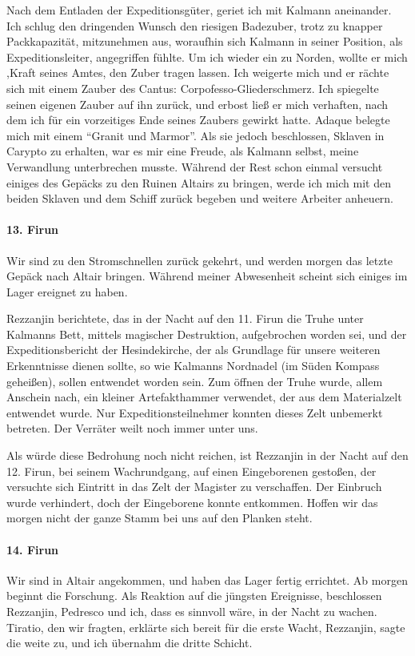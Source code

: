 Nach dem Entladen der Expeditionsgüter, geriet ich mit Kalmann aneinander. Ich schlug den dringenden Wunsch den riesigen Badezuber, trotz zu knapper Packkapazität, mitzunehmen aus, woraufhin sich Kalmann in seiner Position, als Expeditionsleiter, angegriffen fühlte. Um ich wieder ein zu Norden, wollte er mich ,Kraft seines Amtes, den Zuber tragen lassen. Ich weigerte mich und er rächte sich mit einem Zauber des Cantus: Corpofesso-Gliederschmerz. Ich spiegelte seinen eigenen Zauber auf ihn zurück, und erbost ließ er mich verhaften, nach dem ich für ein vorzeitiges Ende seines Zaubers gewirkt hatte. Adaque belegte mich mit einem ``Granit und Marmor''. Als sie jedoch beschlossen, Sklaven in Carypto zu erhalten, war es mir eine Freude, als Kalmann selbst, meine Verwandlung unterbrechen musste. Während der Rest schon einmal versucht einiges des Gepäcks zu den Ruinen Altairs zu bringen, werde ich mich mit den beiden Sklaven und dem Schiff zurück begeben und weitere Arbeiter anheuern.

\paragraph{13. Firun}
Wir sind zu den Stromschnellen zurück gekehrt, und werden morgen das letzte Gepäck nach Altair bringen. Während meiner Abwesenheit scheint sich einiges im Lager ereignet zu haben.

Rezzanjin berichtete, das in der Nacht auf den 11. Firun die Truhe unter Kalmanns Bett, mittels magischer Destruktion, aufgebrochen worden sei, und der Expeditionsbericht der Hesindekirche, der als Grundlage für unsere weiteren Erkenntnisse dienen sollte, so wie Kalmanns Nordnadel (im Süden Kompass geheißen), sollen entwendet worden sein. Zum öffnen der Truhe wurde, allem Anschein nach, ein kleiner Artefakthammer verwendet, der aus dem Materialzelt entwendet wurde. Nur Expeditionsteilnehmer konnten dieses Zelt unbemerkt betreten. Der Verräter weilt noch immer unter uns.

Als würde diese Bedrohung noch nicht reichen, ist Rezzanjin in der Nacht auf den 12. Firun, bei seinem Wachrundgang, auf einen Eingeborenen gestoßen, der versuchte sich Eintritt in das Zelt der Magister zu verschaffen. Der Einbruch wurde verhindert, doch der Eingeborene konnte entkommen. Hoffen wir das morgen nicht der ganze Stamm bei uns auf den Planken steht.

\paragraph{14. Firun}
Wir sind in Altair angekommen, und haben das Lager fertig errichtet. Ab morgen beginnt die Forschung. Als Reaktion auf die jüngsten Ereignisse, beschlossen Rezzanjin, Pedresco und ich, dass es sinnvoll wäre, in der Nacht zu wachen. Tiratio, den wir fragten, erklärte sich bereit für die erste Wacht, Rezzanjin, sagte die weite zu, und ich übernahm die dritte Schicht.

